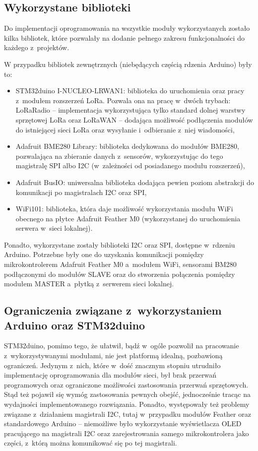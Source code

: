 \subsection{Wykorzystane biblioteki\label{sect:used-libs}} Do implementacji oprogramowania na wszystkie moduły
wykorzystanych zostało kilka bibliotek, które pozwalały na dodanie pełnego zakresu funkcjonalności do każdego
z~projektów.

W przypadku bibliotek zewnętrznych (niebędących częścią rdzenia Arduino) były to:
\begin{itemize}[label=--]
    \item STM32duino I-NUCLEO-LRWAN1: biblioteka do uruchomienia oraz pracy z~modułem rozszerzeń LoRa. Pozwala ona na
          pracę w~dwóch trybach: LoRaRadio -- implementacja wykorzystująca tylko standard dolnej warstwy sprzętowej LoRa
          oraz LoRaWAN -- dodająca możliwość podłączenia modułów do istniejącej sieci LoRa oraz wysyłanie i~odbieranie
          z~niej wiadomości,
    \item Adafruit BME280 Library: biblioteka dedykowana do modułów BME280, pozwalająca na zbieranie danych z~sensorów,
          wykorzystując do tego magistralę SPI albo I2C (w~zależności od posiadanego modułu rozszerzeń),
    \item Adafruit BusIO: uniwersalna biblioteka dodająca pewien poziom abstrakcji do komunikacji po magistralach I2C
          oraz SPI,
    \item WiFi101: biblioteka, która daje możliwość wykorzystania modułu WiFi obecnego na płytce Adafruit Feather M0
          (wykorzystanej do uruchomienia serwera w~sieci lokalnej).
\end{itemize}
Ponadto, wykorzystane zostały biblioteki I2C oraz SPI, dostępne w~rdzeniu Arduino. Potrzebne były one do uzyskania
komunikacji pomiędzy mikrokontrolerem Adafruit Feather M0 a~modułem WiFi, sensorami BM280 podłączonymi do modułów SLAVE
oraz do stworzenia połączenia pomiędzy modułem MASTER a~płytką z~serwerem sieci lokalnej.

\subsection{Ograniczenia związane z~wykorzystaniem Arduino oraz STM32duino\label{sect:framework-limits}} STM32duino,
pomimo tego, że ułatwił, bądź w~ogóle pozwolił na pracowanie z~wykorzystywanymi modułami, nie jest platformą idealną,
pozbawioną ograniczeń. Jedynym z~nich, które w~dość znacznym stopniu utrudniło implementację oprogramowania dla modułów
sieci, był brak przerwań programowych oraz ograniczone możliwości zastosowania przerwań sprzętowych. Stąd też pojawił
się wymóg zastosowania pewnych obejść, jednocześnie tracąc na wydajności implementowanego rozwiązania. Ponadto,
występowały też problemy związane z~działaniem magistrali I2C, tutaj w~przypadku modułów Feather oraz standardowego
Arduino -- niemożliwe było wykorzystanie wyświetlacza OLED pracującego na magistrali I2C oraz zarejestrowania samego
mikrokontrolera jako części, z~którą można komunikować się po tej magistrali.

